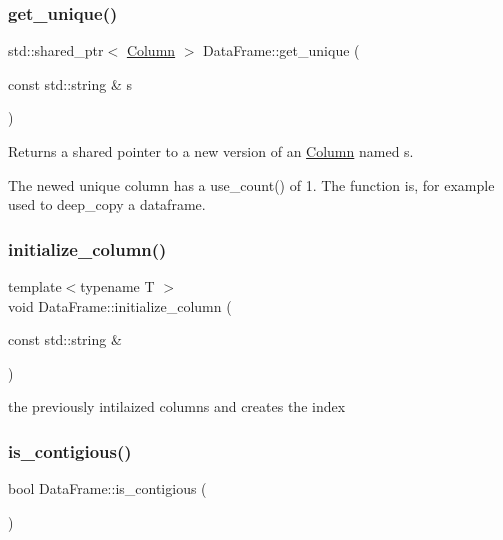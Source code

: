 \subsubsection{\texorpdfstring{get\+\_\+unique()}{get\_unique()}}
{\footnotesize\ttfamily std\+::shared\+\_\+ptr$<$ \hyperlink{classColumn}{Column} $>$ Data\+Frame\+::get\+\_\+unique (\begin{DoxyParamCaption}\item[{const std\+::string \&}]{s }\end{DoxyParamCaption})}



Returns a shared pointer to a new version of an \hyperlink{classColumn}{Column} named s. 

The newed unique column has a use\+\_\+count() of 1. The function is, for example used to deep\+\_\+copy a dataframe. \mbox{\label{classDataFrame_a133bc6ff5a8d26e77deb65ec005f32a7}} 
\subsubsection{\texorpdfstring{initialize\+\_\+column()}{initialize\_column()}}
{\footnotesize\ttfamily template$<$typename T $>$ \\
void Data\+Frame\+::initialize\+\_\+column (\begin{DoxyParamCaption}\item[{const std\+::string \&}]{ }\end{DoxyParamCaption})\hspace{0.3cm}{\ttfamily [private]}}

the previously intilaized columns and creates the index \mbox{\label{classDataFrame_a40f6420c823601946d56ba625484a74e}} 
\subsubsection{\texorpdfstring{is\+\_\+contigious()}{is\_contigious()}}
{\footnotesize\ttfamily bool Data\+Frame\+::is\+\_\+contigious (\begin{DoxyParamCaption}{ }\end{DoxyParamCaption})}




